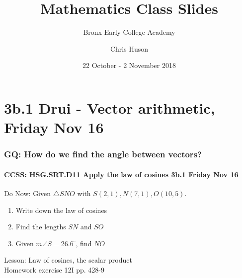 \documentclass{beamer}
\title{Mathematics Class Slides}
\subtitle{Bronx Early College Academy}
\author{Chris Huson}
\date{22 October - 2 November 2018}
\begin{document}
\frame{\titlepage}

\section[Outline]{}
\frame{\tableofcontents}


\section{3b.1 Drui - Vector arithmetic, Friday Nov 16}
  \frame
  {
    \frametitle{GQ: How do we find the angle between vectors?}
    \framesubtitle{CCSS: HSG.SRT.D11 Apply the law of cosines \qquad \alert{3b.1 Friday Nov 16}}

    \begin{block}{Do Now: Given $\triangle SNO$ with $S(2,1),N(7,1),O(10,5)$.}
    \begin{enumerate}
        \item Write down the law of cosines
        \item Find the lengths $SN$ and $SO$
        \item Given $m\angle S=26.6^\circ$, find $NO$
    \end{enumerate}
    \end{block}

    Lesson: Law of cosines, the scalar product\\
    Homework exercise 12I pp. 428-9
  }
\end{document}

